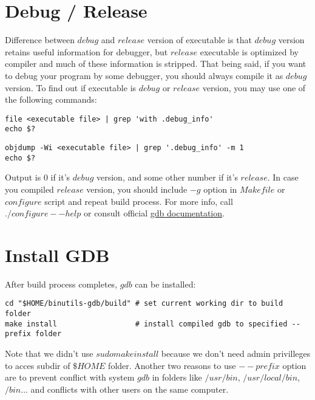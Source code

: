 \documentclass{report}
\begin{document}
\section *{Debug / Release}
Difference between $debug$ and $release$ version of executable is that $debug$ version retains useful information for debugger, but $release$ executable is optimized by compiler and much of these information is stripped. That being said, if you want to debug your program by some debugger, you should always compile it as $debug$ version.
To find out if executable is $debug$ or $release$ version, you may use one of the following commands:
\begin{verbatim}
file <executable file> | grep 'with .debug_info'
echo $?
\end{verbatim}
\begin{verbatim}
objdump -Wi <executable file> | grep '.debug_info' -m 1
echo $?
\end{verbatim}
Output is $0$ if it's $debug$ version, and some other number if it's $release$.
In case you compiled $release$ version, you should include $-g$ option in $Makefile$ or $configure$ script and repeat build process. For more info, call $./configure --help$ or consult official \href{https://github.com/bminor/binutils-gdb/tree/master/gdb}{\underline{gdb documentation}}.

\section *{Install GDB}
After build process completes, $gdb$ can be installed:
\begin{verbatim}
cd "$HOME/binutils-gdb/build" # set current working dir to build folder
make install                  # install compiled gdb to specified --prefix folder
\end{verbatim}
Note that we didn't use $sudo make install$ because we don't need admin privilleges to acces subdir of $\$HOME$ folder. Another two reasons to use $--prefix$ option are to prevent conflict with system $gdb$ in folders like $/usr/bin$, $/usr/local/bin$, $/bin$... and conflicts with other users on the same computer.
\end{document}
